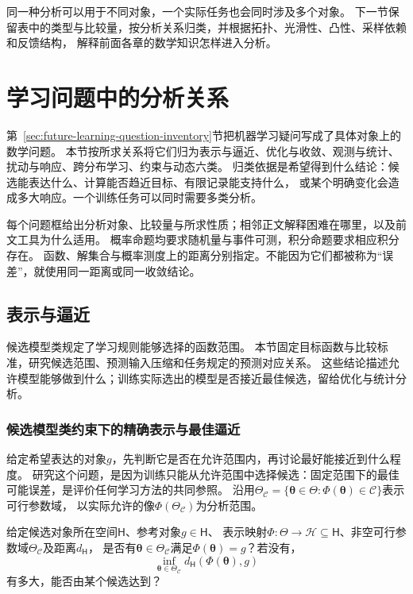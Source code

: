 同一种分析可以用于不同对象，一个实际任务也会同时涉及多个对象。
下一节保留表中的类型与比较量，按分析关系归类，并根据拓扑、光滑性、凸性、采样依赖和反馈结构，
解释前面各章的数学知识怎样进入分析。

\FloatBarrier
\section{学习问题中的分析关系}
\label{sec:future-mathematical-question-map}
\label{sec:future-mathematical-questions-and-learning-guarantees}

第~\ref{sec:future-learning-question-inventory}节把机器学习疑问写成了具体对象上的数学问题。
本节按所求关系将它们归为表示与逼近、优化与收敛、观测与统计、扰动与响应、跨分布学习、约束与动态六类。
归类依据是希望得到什么结论：候选能表达什么、计算能否趋近目标、有限记录能支持什么，
或某个明确变化会造成多大响应。一个训练任务可以同时需要多类分析。

每个问题框给出分析对象、比较量与所求性质；相邻正文解释困难在哪里，以及前文工具为什么适用。
概率命题均要求随机量与事件可测，积分命题要求相应积分存在。
函数、解集合与概率测度上的距离分别指定。不能因为它们都被称为“误差”，就使用同一距离或同一收敛结论。

\subsection{表示与逼近}
\label{sec:future-core-learning-problem-map}

候选模型类规定了学习规则能够选择的函数范围。
本节固定目标函数与比较标准，研究候选范围、预测输入压缩和任务规定的预测对应关系。
这些结论描述允许模型能够做到什么；训练实际选出的模型是否接近最佳候选，留给优化与统计分析。

\subsubsection{候选模型类约束下的精确表示与最佳逼近}
\label{sec:future-analysis-representation}

给定希望表达的对象$g$，先判断它是否在允许范围内，再讨论最好能接近到什么程度。
研究这个问题，是因为训练只能从允许范围中选择候选：固定范围下的最佳可能误差，是评价任何学习方法的共同参照。
沿用$\Theta_{\mathcal C}=\{\bm\theta\in\Theta:\Phi(\bm\theta)\in\mathcal C\}$表示可行参数域，
以实际允许的像$\Phi(\Theta_{\mathcal C})$为分析范围。

\begin{mathproblem}[目标的表示与逼近]
  \label{question:future-representation}
  给定候选对象所在空间$\mathsf H$、参考对象$g\in\mathsf H$、
  表示映射$\Phi:\Theta\to\mathcal H\subseteq\mathsf H$、非空可行参数域$\Theta_{\mathcal C}$及距离$d_{\mathsf H}$，
  是否有$\bm\theta\in\Theta_{\mathcal C}$满足$\Phi(\bm\theta)=g$？若没有，
  \[
    \inf_{\bm\theta\in\Theta_{\mathcal C}}
      d_{\mathsf H}(\Phi(\bm\theta),g)
  \]
  有多大，能否由某个候选达到？
\end{mathproblem}

